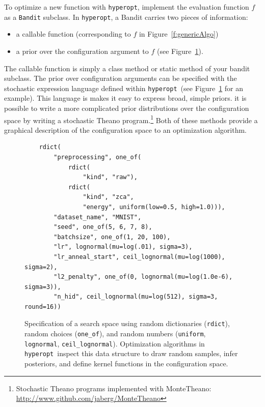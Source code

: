 \documentclass{article}
\newcommand{\hyperopt}{{\tt hyperopt}}
\begin{document}
To optimize a new function with \hyperopt, implement the evaluation function $f$ as a {\tt Bandit} subclass.
In \hyperopt, a Bandit carries two pieces of information:
\begin{itemize}
    \item a callable function (corresponding to $f$ in Figure~\ref{f:genericAlgo})
    \item a prior over the configuration argument to $f$ (see Figure~\ref{f:htdict}).
\end{itemize}
The callable function is simply a class method or static method of your bandit subclass.
The prior over configuration arguments can be specified with the stochastic expression
language defined within \hyperopt\ (see Figure~\ref{f:htdict} for an example).
This language is makes it easy to express broad, simple priors.
it is possible to write a more complicated prior distributions over the configuration space
by writing a stochastic Theano program.\footnote{
Stochastic Theano programs implemented with MonteTheano:
\url{http://www.github.com/jaberg/MonteTheano}}
Both of these methods provide a graphical description of the
configuration space to an optimization algorithm.

\begin{figure}
\begin{minipage}{\textwidth}
\small
\begin{verbatim}
    rdict(
        "preprocessing", one_of(
            rdict(
                "kind", "raw"),
            rdict(
                "kind", "zca",
                "energy", uniform(low=0.5, high=1.0))),
        "dataset_name", "MNIST",
        "seed", one_of(5, 6, 7, 8),
        "batchsize", one_of(1, 20, 100),
        "lr", lognormal(mu=log(.01), sigma=3),
        "lr_anneal_start", ceil_lognormal(mu=log(1000), sigma=2),
        "l2_penalty", one_of(0, lognormal(mu=log(1.0e-6), sigma=3)),
        "n_hid", ceil_lognormal(mu=log(512), sigma=3, round=16))
\end{verbatim}
\end{minipage}
\caption{Specification of a search space using random dictionaries
({\tt \small rdict}), random choices ({\tt \small one\_of}), and random numbers ({\tt \small uniform},
{\tt \small lognormal}, {\tt \small ceil\_lognormal}).
Optimization algorithms in \hyperopt\ inspect this data structure to
draw random samples, infer posteriors, and define kernel functions in the configuration space.
}
\label{f:htdict}
\end{figure}
\end{document}
